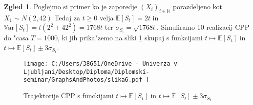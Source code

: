 \documentclass[12pt, a4paper, reqno]{amsart}
\theoremstyle{definition}
\newtheorem{zgled}[definicija]{Zgled}
\theoremstyle{plain}
\newcommand{\R}{\mathbb{R}}
\newcommand{\N}{\mathbb{N}}
\newcommand{\E}{\mathbb{E}}
\newcommand{\Prob}{\mathbb{P}}
\newcommand{\1}{\mathds{1}}
\newcommand{\Var}[1]{\text{$\mathbb{V}\!\mathrm{ar}$}\left[#1\right]}
\begin{document}
    \begin{zgled}
        Poglejmo si primer ko je zaporedje $(X_i)_{i\in\N}$ porazdeljeno kot $X_1\sim N(2, 42)$ 
        Tedaj za $t\geq 0 $ velja $\E\left[S_t\right] = 2t$ in 
        $\Var{S_t} = t(2^2 + 42^2) = 1768t$ ter $\sigma_{S_t} = \sqrt{1768t}$. Simuliramo 10 realizacij CPP do "casa $T=1000$, 
        ki jih prika"zemo na sliki \ref{fig:slika6} skupaj s funkcijami $t \mapsto \E\left[S_t\right]$ in $t \mapsto \E\left[S_t\right] \pm 3\sigma_{S_t}$. 
        \begin{figure}[H]
            \centering
            \texttt{[image: 
                C:/Users/38651/OneDrive - Univerza v Ljubljani/Desktop/Diploma/Diplomski-seminar/GraphsAndPhotos/slika6.pdf
                ]}
            \caption{Trajektorije CPP s funckijami $t \mapsto \E\left[S_t\right]$ in $t \mapsto \E\left[S_t\right] \pm 3\sigma_{S_t}$}
            \label{fig:slika6}
        \end{figure}

    \end{zgled}
    
%
%
%
%
%
%
%
%
\end{document}
